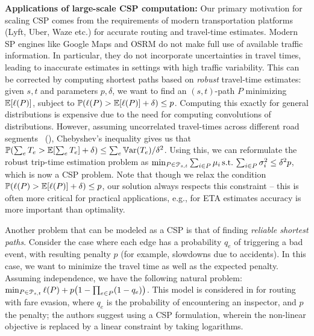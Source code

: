 \smallskip
\noindent\textbf{Applications of large-scale CSP computation:}
Our primary motivation for scaling CSP comes from the requirements of modern transportation platforms (Lyft, Uber, Waze etc.) for accurate routing and travel-time estimates.
Modern SP engines like Google Maps and OSRM do not make full use of available traffic information.
In particular, they do not incorporate uncertainties in travel times, leading to inaccurate estimates in settings with high traffic variability.
This can be corrected by computing shortest paths based on \emph{robust} travel-time estimates:
given $s,t$ and parameters $p,\delta$, we want to find an $(s,t)$-path $P$ minimizing $\mathbb{E}[\ell(P)]$, subject to $\mathbb{P}(\ell(P)>\mathbb{E}[\ell(P)]+\delta)\leq p$.
Computing this exactly for general distributions is expensive due to the need for computing convolutions of distributions. 
However, assuming uncorrelated travel-times across different road segments~\cite{woodard2017predicting} (), 
Chebyshev's inequality gives us that $\mathbb{P}(\sum_eT_e>\mathbb{E}[\sum_eT_e]+\delta)\leq \sum_e\mathbb{V}\textnormal{ar}(T_e)/\delta^2$. Using this, we can reformulate the robust trip-time estimation problem as 
$\min_{ P\in\mathcal{P}_{s,t}}\sum_{i\in P}\mu_i \, \mbox{s.t.}\, \sum_{i\in P}\sigma^2_i\leq \delta^2p$, which is now a CSP problem. 
Note that though we relax the condition $\mathbb{P}(\ell(P)>\mathbb{E}[\ell(P)]+\delta)\leq p$, our solution always respects this constraint -- this is often more critical for practical applications, e.g., for ETA estimates accuracy is more important than optimality.

Another problem that can be modeled as a CSP is that of finding \emph{reliable shortest paths}.
Consider the case where each edge has a probability $q_e$ of triggering a bad event, with resulting penalty $p$ (for example, slowdowns due to accidents).
In this case, we want to minimize the travel time as well as the expected penalty.
Assuming independence, we have the following natural problem:
$\min_{P\in\Pst} \ell(P)+p\prn*{1-\prod_{e\in P}(1-q_e)}$.
This model is considered in \cite{fareevasion} for routing with fare evasion, where $q_e$ is the probability of encountering an inspector, and $p$ the penalty; the authors suggest using a CSP formulation, wherein the non-linear objective is replaced by a linear constraint by taking logarithms.


